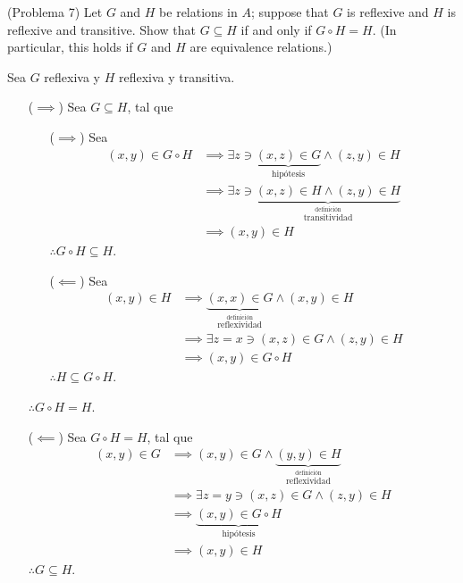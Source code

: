 \begin{problema}(Problema 7)
	Let $G$ and $H$ be relations in $A$; suppose that $G$ is reflexive and $H$ is reflexive and transitive. Show that $G \subseteq H$ if and only if $G \circ H=H$. (In particular, this holds if $G$ and $H$ are equivalence relations.)
	\begin{dem}
		Sea $G$ reflexiva y $H$ reflexiva y transitiva. 
		\begin{enumerate}
			\item[($\implies$)] Sea $G\subseteq H$, tal que 
			\begin{enumerate}
				\item[($\implies$)] Sea
				\begin{align*}
					(x,y)\in G\circ H &\implies \exists z\ni \underbrace{(x,z)\in G}_{\text{hipótesis}}\wedge (z,y)\in H \\
					&\implies \exists z\ni \underbrace{(x,z)\in H\wedge (z,y)\in H}_{\stackrel{\text{definición}}{\text{transitividad}}}\\
					&\implies (x,y)\in H 
				\end{align*}
				$\therefore G\circ H\subseteq H$.
				
				\item[($\impliedby$)]  Sea
				\begin{align*}
					(x,y)\in H &\implies \underbrace{(x,x)\in G}_{\stackrel{\text{definición}}{\text{reflexividad}}}  \wedge(x,y)\in H \\
					&\implies \exists z=x\ni (x,z)\in G\wedge (z,y)\in H\\
					&\implies (x,y)\in G\circ H
				\end{align*}
				$\therefore H\subseteq G\circ H$. 
			\end{enumerate}
			$\therefore G\circ H=H$.  
			\item[($\impliedby$)]  Sea $G\circ H=H$, tal que 
			\begin{align*}
				(x,y)\in G &\implies (x,y)\in G  \wedge \underbrace{(y,y)\in H}_{\stackrel{\text{definición}}{\text{reflexividad}}} \\
				&\implies \exists z=y \ni (x,z)\in G \wedge (z,y)\in H\\
				&\implies \underbrace{(x,y)\in G\circ H }_{\text{hipótesis}}\\
				&\implies (x,y)\in H	
					\end{align*}
			$\therefore G\subseteq H$. 
		\end{enumerate}
	\end{dem}
\end{problema}

